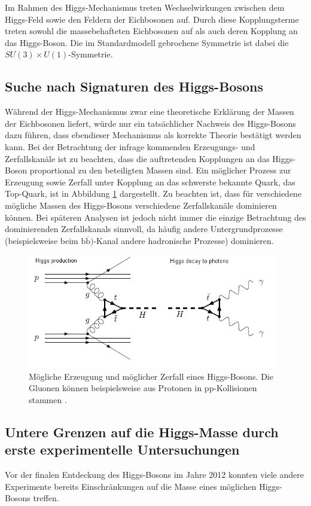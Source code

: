 Im Rahmen des Higgs-Mechanismus treten Wechselwirkungen zwischen dem Higgs-Feld sowie den Feldern der Eichbosonen auf.
Durch diese Kopplungsterme treten sowohl die massebehafteten Eichbosonen auf als auch deren Kopplung an das Higgs-Boson.
Die im Standardmodell gebrochene Symmetrie ist dabei die $SU(3) \times U(1)$-Symmetrie.

\subsection{Suche nach Signaturen des Higgs-Bosons}
Während der Higgs-Mechanismus zwar eine theoretische Erklärung der Massen der Eichbosonen liefert, würde nur ein tatsächlicher Nachweis des Higgs-Bosons dazu führen, dass ebendieser Mechanismus als korrekte Theorie bestätigt werden kann.
Bei der Betrachtung der infrage kommenden Erzeugungs- und Zerfallskanäle ist zu beachten, dass die auftretenden Kopplungen an das Higgs-Boson proportional zu den beteiligten Massen sind.
Ein möglicher Prozess zur Erzeugung sowie Zerfall unter Kopplung an das schwerste bekannte Quark, das Top-Quark, ist in Abbildung \ref{fig:higgs2} dargestellt.
Zu beachten ist, dass für verschiedene mögliche Massen des Higgs-Bosons verschiedene Zerfallskanäle dominieren können.
Bei späteren Analysen ist jedoch nicht immer die einzige Betrachtung des dominierenden Zerfallskanals sinnvoll, da häufig andere Untergrundprozesse (beispielsweise beim $\text{b}\overline{\text{b}})$-Kanal andere hadronische Prozesse) dominieren.

\begin{figure}
  \centering
  \includegraphics[height=5.0cm]{ressources/higgsfeyn.png}
  \caption{Mögliche Erzeugung und möglicher Zerfall eines Higgs-Bosons. Die Gluonen können beispielsweise aus Protonen in pp-Kollisionen stammen \cite{higgs_production_decay}.}
  \label{fig:higgs2}
\end{figure}

\subsection{Untere Grenzen auf die Higgs-Masse durch erste experimentelle Untersuchungen}
Vor der finalen Entdeckung des Higgs-Bosons im Jahre 2012 konnten viele andere Experimente bereits Einschränkungen auf die Masse eines möglichen Higgs-Bosons treffen.

